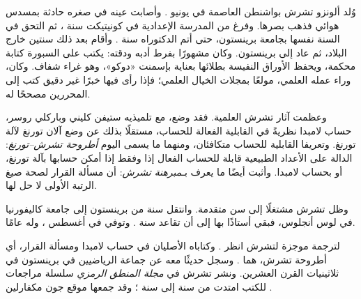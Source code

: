 \documentclass[../../../include/open-logic-section]{subfiles}
\begin{document}



وُلد ألونزو تشرش بواشنطن العاصمة في  يونيو . وأصابت عينه في صغره
حادثة بمسدس هوائي فذهب بصرها. وفرغ من المدرسة الإعدادية في كونيتيكت
سنة ، ثم التحق في السنة نفسها بجامعة برينستون، حتى أتم الدكتوراه
سنة . وأقام بعد ذلك سنتين خارج البلاد، ثم عاد إلى برينستون. وكان
مشهورًا بفرط أدبه ودقته: يكتب على السبورة كتابة محكمة، ويحفظ الأوراق
النفيسة بطلائها بعناية بإسمنت «دوكو»، وهو غراء شفاف. وكان، وراء عمله
العلمي، مولعًا بمجلات الخيال العلمي؛ فإذا رأى فيها خبرًا غير دقيق كتب
إلى المحررين مصححًا له.

وعظمت آثار تشرش العلمية. فقد وضع، مع تلميذيه ستيفن كليني وباركلي روسر،
حساب لامبدا نظريةً في القابلية الفعالة للحساب، مستقلًا بذلك عن وضع آلان
تورنغ لآلة تورنغ. وتعريفا القابلية للحساب متكافئان، ومنهما ما يسمى
اليوم \emph{أطروحة تشرش--تورنغ}: الدالة على الأعداد الطبيعية قابلة
للحساب الفعال إذا وفقط إذا أمكن حسابها بآلة تورنغ، أو بحساب لامبدا.
وأثبت أيضًا ما يعرف بـ\emph{مبرهنة تشرش}: أن مسألة القرار لصحة صيغ
الرتبة الأولى لا حل لها.

وظل تشرش مشتغلًا إلى سن متقدمة. وانتقل سنة  من برينستون إلى جامعة
كاليفورنيا في لوس أنجلوس، فبقي أستاذًا بها إلى أن تقاعد سنة .
وتوفي في  أغسطس ، وله  عامًا.

\begin{reading}
لترجمة موجزة لتشرش انظر \citet{EndertonND}. وكتاباه الأصليان في حساب
لامبدا ومسألة القرار، أي أطروحة تشرش، هما
\citet{Church1936,Church1936a}. وسجل \citet{Aspray1984} حديثًا معه عن
جماعة الرياضيين في برينستون في ثلاثينيات القرن العشرين. ونشر تشرش في
\emph{مجلة المنطق الرمزي} سلسلة مراجعات للكتب امتدت من سنة  إلى
سنة ؛ وقد جمعها موقع جون مكفارلين \citep{MacFarlane2015}.
\end{reading}
\end{document}
